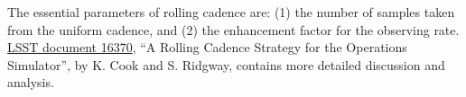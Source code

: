 The essential parameters of rolling cadence are: (1) the number of
samples taken from the uniform cadence, and (2) the enhancement factor
for the observing rate.
\href{https://project.lsst.org/meetings/ocw/sites/lsst.org.meetings.ocw/files/OpSim%20Rolling%20Cadence%20Stratgey-ver1.3.pdf}{LSST document 16370},
``A Rolling Cadence Strategy for the Operations Simulator'', by K. Cook
and S. Ridgway, contains more detailed discussion and analysis.

%
%
%
%
%
%
%
%
%
%
%
%
%
%
%
%
%
%
